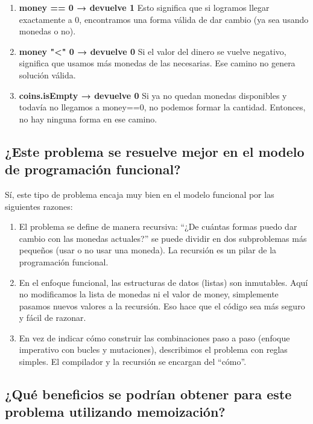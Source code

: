\begin{enumerate}[label={\alph*.}]
    \item \textbf{money == 0 → devuelve 1}
    Esto significa que si logramos llegar exactamente a 0, encontramos una forma válida de dar cambio (ya sea usando monedas o no).

    \item \textbf{money "<" 0 → devuelve 0}
    Si el valor del dinero se vuelve negativo, significa que usamos más monedas de las necesarias. Ese camino no genera solución válida.

    \item \textbf{coins.isEmpty → devuelve 0}
    Si ya no quedan monedas disponibles y todavía no llegamos a money==0, no podemos formar la cantidad. Entonces, no hay ninguna forma en ese camino.
\end{enumerate}


\subsection{¿Este problema se resuelve mejor en el modelo de programación funcional?}

Sí, este tipo de problema encaja muy bien en el modelo funcional por las siguientes razones:

\begin{enumerate}
    \item El problema se define de manera recursiva: “¿De cuántas formas puedo dar cambio con las monedas actuales?” se puede dividir en dos subproblemas más pequeños (usar o no usar una moneda). La recursión es un pilar de la programación funcional.
    \item En el enfoque funcional, las estructuras de datos (listas) son inmutables. Aquí no modificamos la lista de monedas ni el valor de money, simplemente pasamos nuevos valores a la recursión. Eso hace que el código sea más seguro y fácil de razonar.
    \item En vez de indicar cómo construir las combinaciones paso a paso (enfoque imperativo con bucles y mutaciones), describimos el problema con reglas simples. El compilador y la recursión se encargan del “cómo”.
\end{enumerate}


\subsection{¿Qué beneficios se podrían obtener para este problema utilizando memoización?}

